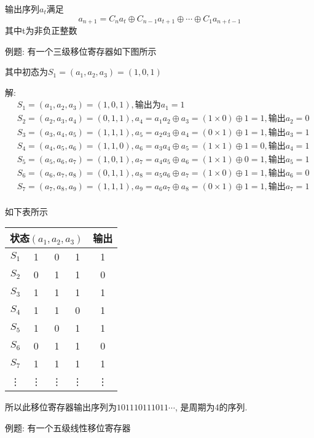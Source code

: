 \documentclass[UTF8]{ctexart}
\begin{document}
  输出序列${a_t}$满足
  $$a_{n+1}=C_na_t\oplus C_{n-1}a_{t+1}\oplus \cdots \oplus C_1a_{n+t-1}$$
  其中t为非负正整数

  例题: 有一个三级移位寄存器如下图所示

  其中初态为$S_1=(a_1, a_2, a_3)=(1, 0, 1)$

  解:
  $$
  \begin{aligned}
    &S_1=(a_1, a_2, a_3)=(1, 0, 1), \mbox{输出为}a_1=1\\
    &S_2=(a_2, a_3, a_4)=(0, 1, 1), a_4=a_1a_2\oplus a_3=(1\times 0)\oplus 1=1, \mbox{输出}a_2=0\\
    &S_3=(a_3, a_4, a_5)=(1, 1, 1), a_5=a_2a_3\oplus a_4=(0\times 1)\oplus 1=1, \mbox{输出}a_3=1\\
    &S_4=(a_4, a_5, a_6)=(1, 1, 0), a_6=a_3a_4\oplus a_5=(1\times 1)\oplus 1=0, \mbox{输出}a_4=1\\
    &S_5=(a_5, a_6, a_7)=(1, 0, 1), a_7=a_4a_5\oplus a_6=(1\times 1)\oplus 0=1, \mbox{输出}a_5=1\\
    &S_6=(a_6, a_7, a_8)=(0, 1, 1), a_8=a_5a_6\oplus a_7=(1\times 0)\oplus 1=1, \mbox{输出}a_6=0\\
    &S_7=(a_7, a_8, a_9)=(1, 1, 1), a_9=a_6a_7\oplus a_8=(0\times 1)\oplus 1=1, \mbox{输出}a_7=1\\
  \end{aligned}
  $$

  如下表所示
  \begin{table}
    \centering
    \begin{tabular}{|c|c|c|c|c|}
      \hline
      \multicolumn{4}{|c|}{状态$(a_1, a_2, a_3)$} &输出\\
      \hline
      $S_1$ &1 &0 &1 &1\\
      \hline
      $S_2$ &0 &1 &1 &0\\
      \hline
      $S_3$ &1 &1 &1 &1\\
      \hline
      $S_4$ &1 &1 &0 &1\\
      \hline
      $S_5$ &1 &0 &1 &1\\
      \hline
      $S_6$ &0 &1 &1 &0\\
      \hline
      $S_7$ &1 &1 &1 &1\\
      \hline
      \vdots &\vdots &\vdots &\vdots &\vdots\\
      \hline
    \end{tabular}
  \end{table}
  所以此移位寄存器输出序列为$101110111011\cdots$, 是周期为4的序列.

  例题: 有一个五级线性移位寄存器
\end{document}

